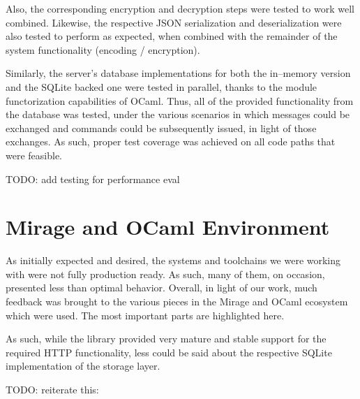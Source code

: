 Also, the corresponding encryption and decryption steps were tested to work well combined.
Likewise, the respective JSON serialization and deserialization were also tested to perform as expected, when combined with the remainder of the system functionality (encoding / encryption).

Similarly, the server's database implementations for both the in--memory version and the SQLite backed one were tested in parallel, thanks to the module functorization capabilities of OCaml.
Thus, all of the provided functionality from the database was tested, under the various scenarios in which messages could be exchanged and commands could be subsequently issued, in light of those exchanges.
As such, proper test coverage was achieved on all code paths that were feasible.

TODO: add testing for performance eval

\section{Mirage and OCaml Environment}
As initially expected and desired, the systems and toolchains we were working with were not fully production ready.
As such, many of them, on occasion, presented less than optimal behavior.
Overall, in light of our work, much feedback was brought to the various pieces in the Mirage and OCaml ecosystem which were used.
The most important parts are highlighted here.

As such, while the  library provided very mature and stable support for the required HTTP functionality, less could be said about the respective SQLite implementation of the storage layer.

TODO: reiterate this:

